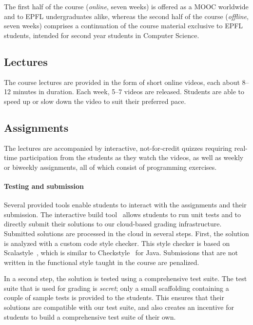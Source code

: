 \documentclass{sig-alternate}
\begin{document}
The first half of the course ({\em online}, seven weeks) is offered as a MOOC worldwide and to EPFL undergraduates alike, whereas the second half of the course ({\em offline}, seven weeks) comprises a continuation of the course material exclusive to EPFL students, intended for second year students in Computer Science.

\subsection{Lectures}\label{sec:mooc-elements}

The course lectures are provided in the form of short
online videos, each about 8--12 minutes in duration. Each week, 5--7
videos are released.
Students are able to speed up or slow down the video to suit their preferred pace.

\subsection{Assignments}

The lectures are accompanied by interactive, not-for-credit
quizzes requiring real-time participation from the students as they watch the videos, as well as weekly or biweekly assignments, all of which
consist of programming exercises.

\paragraph{Testing and submission}
Several provided tools enable students to
interact with the assignments and their submission. The
interactive build tool~\cite{sbt} allows students to run unit tests and to
directly submit their solutions to our cloud-based grading infrastructure.
Submitted solutions are processed in the cloud in several steps. First, the
solution is analyzed with a custom code style checker. This style checker is based
on Scalastyle~\cite{ScalaStyle}, which is similar to
Checkstyle~\cite{Ware08} for Java. Submissions that are not written in the
functional style taught in the course are penalized.

In a second step,
the solution is tested using a comprehensive test suite.
The test suite that is used for grading is {\em secret}; only a small
scaffolding containing a couple of sample tests is provided to the students.
This ensures that their solutions are compatible with our test suite, and
also creates an incentive for students to build a comprehensive test
suite of their own.
\end{document}
